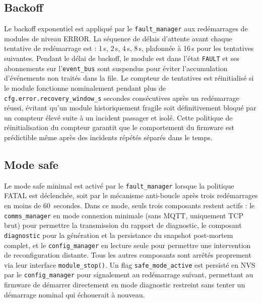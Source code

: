 \subsection{Backoff}
\label{subsec:backoff}

Le backoff exponentiel est appliqué par le \texttt{fault\_manager}
aux redémarrages de modules de niveau ERROR. La séquence de délais
d'attente avant chaque tentative de redémarrage est : 1\,s, 2\,s,
4\,s, 8\,s, plafonnée à 16\,s pour les tentatives suivantes. Pendant
le délai de backoff, le module est dans l'état \texttt{FAULT} et
ses abonnements sur l'\texttt{event\_bus} sont suspendus pour éviter
l'accumulation d'événements non traités dans la file. Le compteur
de tentatives est réinitialisé si le module fonctionne nominalement
pendant plus de \texttt{cfg.error.recovery\_window\_s} secondes
consécutives après un redémarrage réussi, évitant qu'un module
historiquement fragile soit définitivement bloqué par un compteur
élevé suite à un incident passager et isolé. Cette politique de
réinitialisation du compteur garantit que le comportement du firmware
est prédictible même après des incidents répétés séparés dans le
temps.

\subsection{Mode safe}
\label{subsec:safemode}

Le mode safe minimal est activé par le \texttt{fault\_manager} lorsque
la politique FATAL est déclenchée, soit par le mécanisme anti-boucle
après trois redémarrages en moins de 60~secondes. Dans ce mode,
seuls trois composants restent actifs : le \texttt{comms\_manager}
en mode connexion minimale (sans MQTT, uniquement TCP brut) pour
permettre la transmission du rapport de diagnostic, le composant
\texttt{diagnostic} pour la génération et la persistance du snapshot
post-mortem complet, et le \texttt{config\_manager} en lecture seule
pour permettre une intervention de reconfiguration distante. Tous
les autres composants sont arrêtés proprement via leur interface
\texttt{module\_stop()}. Un flag \texttt{safe\_mode\_active} est
persisté en NVS par le \texttt{config\_manager} pour signalement
au redémarrage suivant, permettant au firmware de démarrer
directement en mode diagnostic restreint sans tenter un démarrage
nominal qui échouerait à nouveau.

